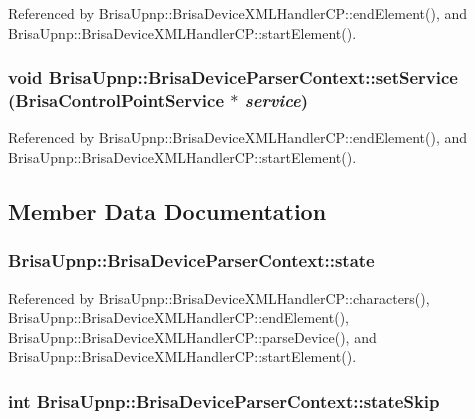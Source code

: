 Referenced by BrisaUpnp::BrisaDeviceXMLHandlerCP::endElement(), and BrisaUpnp::BrisaDeviceXMLHandlerCP::startElement().\hypertarget{classBrisaUpnp_1_1BrisaDeviceParserContext_a0e9813a93f47337012c0f0b3227632a4}{
\subsubsection[{setService}]{\setlength{\rightskip}{0pt plus 5cm}void BrisaUpnp::BrisaDeviceParserContext::setService ({\bf BrisaControlPointService} $\ast$ {\em service})}}
\label{classBrisaUpnp_1_1BrisaDeviceParserContext_a0e9813a93f47337012c0f0b3227632a4}


Referenced by BrisaUpnp::BrisaDeviceXMLHandlerCP::endElement(), and BrisaUpnp::BrisaDeviceXMLHandlerCP::startElement().

\subsection{Member Data Documentation}
\hypertarget{classBrisaUpnp_1_1BrisaDeviceParserContext_a0f7e35905740896c06ceaba7c7a0681d}{
\subsubsection[{state}]{ {\bf BrisaUpnp::BrisaDeviceParserContext::state}}}
\label{classBrisaUpnp_1_1BrisaDeviceParserContext_a0f7e35905740896c06ceaba7c7a0681d}


Referenced by BrisaUpnp::BrisaDeviceXMLHandlerCP::characters(), BrisaUpnp::BrisaDeviceXMLHandlerCP::endElement(), BrisaUpnp::BrisaDeviceXMLHandlerCP::parseDevice(), and BrisaUpnp::BrisaDeviceXMLHandlerCP::startElement().\hypertarget{classBrisaUpnp_1_1BrisaDeviceParserContext_a77686c7b733596cc8c525460a60ec462}{
\subsubsection[{stateSkip}]{\setlength{\rightskip}{0pt plus 5cm}int {\bf BrisaUpnp::BrisaDeviceParserContext::stateSkip}}}
\label{classBrisaUpnp_1_1BrisaDeviceParserContext_a77686c7b733596cc8c525460a60ec462}


